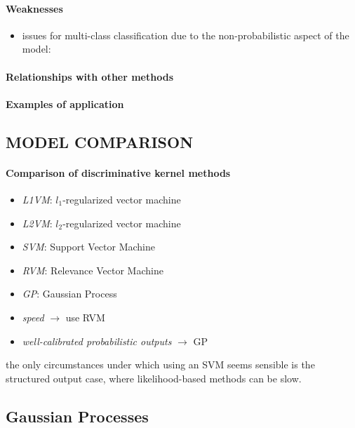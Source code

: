 \paragraph{Weaknesses}
\begin{itemize}
    \item issues for multi-class classification due to the non-probabilistic 
        aspect of the model: 
\end{itemize}

\paragraph{Relationships with other methods}
\paragraph{Examples of application}

\subsection{MODEL COMPARISON}
\paragraph{Comparison of discriminative kernel methods}
\begin{itemize}
    \item \emph{L1VM}: $l_{1}$-regularized vector machine
    \item \emph{L2VM}: $l_{2}$-regularized vector machine
    \item \emph{SVM}: Support Vector Machine
    \item \emph{RVM}: Relevance Vector Machine
    \item \emph{GP}: Gaussian Process
\end{itemize}
\begin{itemize}
    \item \emph{speed} $\rightarrow$ use RVM
    \item \emph{well-calibrated probabilistic outputs} $\rightarrow$ GP
\end{itemize}
the only circumstances under which using an SVM seems sensible is the structured output
case, where likelihood-based methods can be slow.


\subsection{Gaussian Processes}
